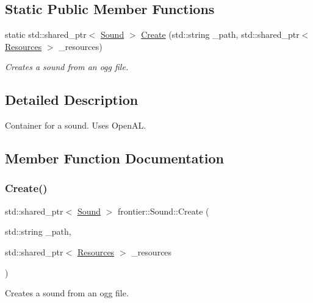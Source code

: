 \subsection*{Static Public Member Functions}
\begin{DoxyCompactItemize}
\item 
static std\+::shared\+\_\+ptr$<$ \hyperlink{classfrontier_1_1_sound}{Sound} $>$ \hyperlink{classfrontier_1_1_sound_af5b4d6b995926f68fe4219b144046093}{Create} (std\+::string \+\_\+path, std\+::shared\+\_\+ptr$<$ \hyperlink{classfrontier_1_1_resources}{Resources} $>$ \+\_\+resources)
\begin{DoxyCompactList}\small\item\em Creates a sound from an ogg file. \end{DoxyCompactList}\end{DoxyCompactItemize}


\subsection{Detailed Description}
Container for a sound. Uses Open\+AL. 

\subsection{Member Function Documentation}
\mbox{\label{classfrontier_1_1_sound_af5b4d6b995926f68fe4219b144046093}} 
\subsubsection{\texorpdfstring{Create()}{Create()}}
{\footnotesize\ttfamily std\+::shared\+\_\+ptr$<$ \hyperlink{classfrontier_1_1_sound}{Sound} $>$ frontier\+::\+Sound\+::\+Create (\begin{DoxyParamCaption}\item[{std\+::string}]{\+\_\+path,  }\item[{std\+::shared\+\_\+ptr$<$ \hyperlink{classfrontier_1_1_resources}{Resources} $>$}]{\+\_\+resources }\end{DoxyParamCaption})\hspace{0.3cm}{\ttfamily [static]}}



Creates a sound from an ogg file. 


